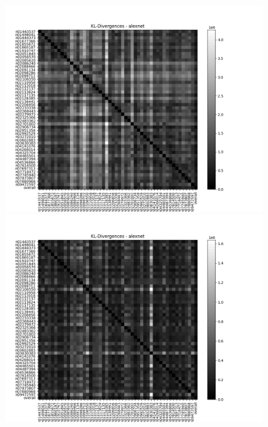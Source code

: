 \documentclass{article}
\begin{document}
\begin{figure}[H]
\begin{minipage}{0.45\textwidth}
        \end{minipage}\hfill
        \begin{minipage}{0.45\textwidth}
            \centering
            \includegraphics[width=\textwidth]{images/alexnet_kl_matrix_r.png} %
        \end{minipage}
        \begin{minipage}{0.45\textwidth}
            \centering
            \includegraphics[width=\textwidth]{images/alexnet_kl_matrix_untrained_r_2.png} %
            

\end{minipage}
\end{figure}
\end{document}
